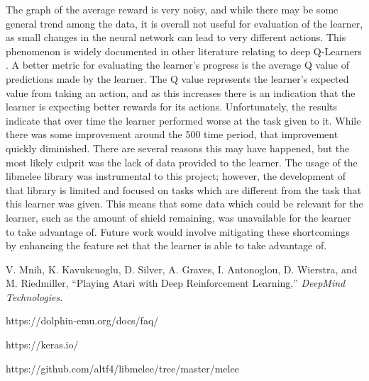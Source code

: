 \documentclass{article}
\begin{document}
The graph of the average reward is very noisy, and while there may be some general trend among the data, it is overall not useful for evaluation
of the learner, as small changes in the neural network can lead to very different actions. This phenomenon is widely documented in other literature
relating to deep Q-Learners \cite{atari}. A better metric for evaluating the learner's progress is the average Q value of predictions made by the learner.
The Q value represents the learner's expected value from taking an action, and as this increases there is an indication that the learner is 
expecting better rewards for its actions. Unfortunately, the results indicate that over time the learner performed worse at the task given to it.
While there was some improvement around the 500 time period, that improvement quickly diminished. There are several reasons this may have
happened, but the most likely culprit was the lack of data provided to the learner. The usage of the libmelee library was instrumental to this
project; however, the development of that library is limited and focused on tasks which are different from the task that this learner was given.
This means that some data which could be relevant for the learner, such as the amount of shield remaining, was unavailable for the learner to take
advantage of. Future work would involve mitigating these shortcomings by enhancing the feature set that the learner is able to take advantage of.

\begin{thebibliography}{5}
V. Mnih, K. Kavukcuoglu, D. Silver, A. Graves, I. Antonoglou, D. Wierstra, and M. Riedmiller, “Playing Atari with Deep Reinforcement Learning,” \textit{DeepMind Technologies}.

https://dolphin-emu.org/docs/faq/

https://keras.io/

https://github.com/altf4/libmelee/tree/master/melee

\end{thebibliography}
\end{document}
